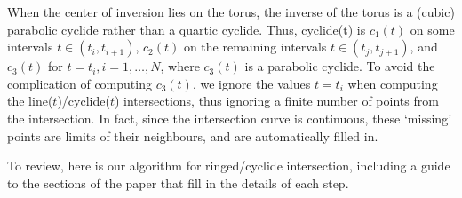 \begin{rmk}
\label{rmk:noton}
When the center of inversion lies on the torus,
the inverse of the torus is a (cubic) parabolic cyclide
rather than a quartic cyclide.
Thus, cyclide(t) is $c_1(t)$ on some intervals $t \in (t_i,t_{i+1})$,
$c_2(t)$ on the remaining intervals $t \in (t_j,t_{j+1})$,
and $c_3(t)$ for $t = t_i, i = 1,\ldots,N$, where $c_3(t)$ is a parabolic 
cyclide.
To avoid the complication of computing $c_3(t)$,
we ignore the values $t=t_i$ when computing the line($t$)/cyclide($t$) 
intersections, thus ignoring
a finite number of points from the intersection.
In fact, since the intersection curve is continuous,
these `missing' points are limits of their neighbours,
and are automatically filled in.
\end{rmk}

To review, here is our algorithm for ringed/cyclide intersection,
including a guide to the sections of the paper that fill in the details
of each step.

\ifFull
\vspace{.2in}
\else
\clearpage
\fi

